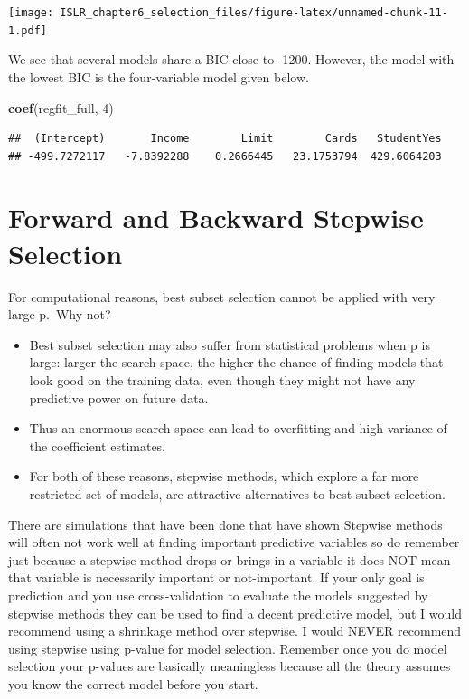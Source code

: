 \documentclass[
]{article}
\newenvironment{Shaded}{\begin{snugshade}}{\end{snugshade}}
\newcommand{\DecValTok}[1]{\textcolor[rgb]{0.00,0.00,0.81}{#1}}
\newcommand{\KeywordTok}[1]{\textcolor[rgb]{0.13,0.29,0.53}{\textbf{#1}}}
\newcommand{\NormalTok}[1]{#1}
\providecommand{\tightlist}{%
  \setlength{\itemsep}{0pt}\setlength{\parskip}{0pt}}
\begin{document}
\texttt{[image: ISLR\_chapter6\_selection\_files/figure-latex/unnamed-chunk-11-1.pdf]}

We see that several models share a BIC close to -1200. However, the
model with the lowest BIC is the four-variable model given below.

\begin{Shaded}
\begin{Highlighting}[]
\KeywordTok{coef}\NormalTok{(regfit_full, }\DecValTok{4}\NormalTok{)}
\end{Highlighting}
\end{Shaded}

\begin{verbatim}
##  (Intercept)       Income        Limit        Cards   StudentYes 
## -499.7272117   -7.8392288    0.2666445   23.1753794  429.6064203
\end{verbatim}

\hypertarget{forward-and-backward-stepwise-selection}{%
\section{Forward and Backward Stepwise
Selection}\label{forward-and-backward-stepwise-selection}}

For computational reasons, best subset selection cannot be applied with
very large p.~Why not?

\begin{itemize}
\tightlist
\item
  Best subset selection may also suffer from statistical problems when p
  is large: larger the search space, the higher the chance of finding
  models that look good on the training data, even though they might not
  have any predictive power on future data.
\item
  Thus an enormous search space can lead to overfitting and high
  variance of the coefficient estimates.
\item
  For both of these reasons, stepwise methods, which explore a far more
  restricted set of models, are attractive alternatives to best subset
  selection.
\end{itemize}

There are simulations that have been done that have shown Stepwise
methods will often not work well at finding important predictive
variables so do remember just because a stepwise method drops or brings
in a variable it does NOT mean that variable is necessarily important or
not-important. If your only goal is prediction and you use
cross-validation to evaluate the models suggested by stepwise methods
they can be used to find a decent predictive model, but I would
recommend using a shrinkage method over stepwise. I would NEVER
recommend using stepwise using p-value for model selection. Remember
once you do model selection your p-values are basically meaningless
because all the theory assumes you know the correct model before you
start.
\end{document}
